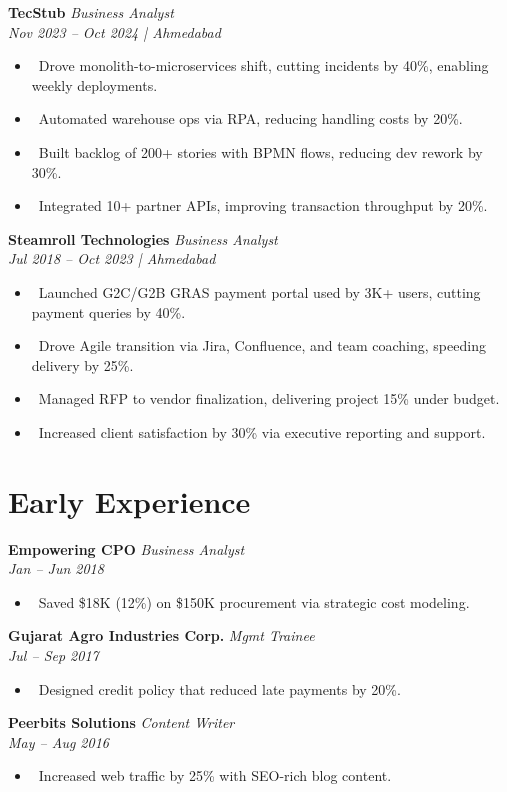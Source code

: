 \documentclass[11pt,a4paper]{article}
\newcommand{\resumeItem}[1]{\item \textbullet\ #1}
\begin{document}
\textbf{TecStub} \hfill \textit{Business Analyst}\\
\textit{Nov 2023 – Oct 2024 | Ahmedabad}
\begin{itemize}[leftmargin=*,noitemsep]
  \resumeItem{Drove monolith-to-microservices shift, cutting incidents by 40\%, enabling weekly deployments.}
  \resumeItem{Automated warehouse ops via RPA, reducing handling costs by 20\%.}
  \resumeItem{Built backlog of 200+ stories with BPMN flows, reducing dev rework by 30\%.}
  \resumeItem{Integrated 10+ partner APIs, improving transaction throughput by 20\%.}
\end{itemize}

\textbf{Steamroll Technologies} \hfill \textit{Business Analyst}\\
\textit{Jul 2018 – Oct 2023 | Ahmedabad}
\begin{itemize}[leftmargin=*,noitemsep]
  \resumeItem{Launched G2C/G2B GRAS payment portal used by 3K+ users, cutting payment queries by 40\%.}
  \resumeItem{Drove Agile transition via Jira, Confluence, and team coaching, speeding delivery by 25\%.}
  \resumeItem{Managed RFP to vendor finalization, delivering project 15\% under budget.}
  \resumeItem{Increased client satisfaction by 30\% via executive reporting and support.}
\end{itemize}

\section*{Early Experience}
\textbf{Empowering CPO} \hfill \textit{Business Analyst}\\
\textit{Jan – Jun 2018}
\begin{itemize}[leftmargin=*,noitemsep]
  \resumeItem{Saved \$18K (12\%) on \$150K procurement via strategic cost modeling.}
\end{itemize}

\textbf{Gujarat Agro Industries Corp.} \hfill \textit{Mgmt Trainee}\\
\textit{Jul – Sep 2017}
\begin{itemize}[leftmargin=*,noitemsep]
  \resumeItem{Designed credit policy that reduced late payments by 20\%.}
\end{itemize}

\textbf{Peerbits Solutions} \hfill \textit{Content Writer}\\
\textit{May – Aug 2016}
\begin{itemize}[leftmargin=*,noitemsep]
  \resumeItem{Increased web traffic by 25\% with SEO-rich blog content.}
\end{itemize}
\end{document}
